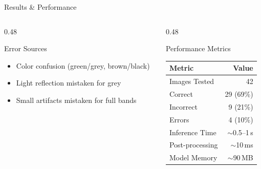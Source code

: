 \documentclass[aspectratio=169, 11pt]{beamer}
\newenvironment{compactitemize}{%
  \begin{itemize}\setlength{\itemsep}{1pt}\setlength{\parskip}{0pt}\setlength{\parsep}{0pt}%
}{\end{itemize}}
\begin{document}
\begin{frame}{Results \& Performance}
\begin{columns}[T]
\begin{column}{0.48\textwidth}
\vspace{0.05cm}
\begin{alertblock}{Error Sources}
\scriptsize
\begin{compactitemize}
  \item Color confusion (green/grey, brown/black)
  \item Light reflection mistaken for grey
  \item Small artifacts mistaken for full bands
\end{compactitemize}
\end{alertblock}
\end{column}
\begin{column}{0.48\textwidth}
\begin{block}{Performance Metrics}
\scriptsize
\renewcommand{\arraystretch}{1.0}
\begin{tabular}{l r}
\toprule
\textbf{Metric} & \textbf{Value} \\
\midrule
Images Tested & 42 \\
Correct & 29 (69\%) \\
Incorrect & 9 (21\%) \\
Errors & 4 (10\%) \\
\midrule
Inference Time & $\sim$0.5--1\,s \\
Post-processing & $\sim$10\,ms \\
Model Memory & $\sim$90\,MB \\
\bottomrule
\end{tabular}
\end{block}
\end{column}
\end{columns}
\end{frame}
\end{document}
